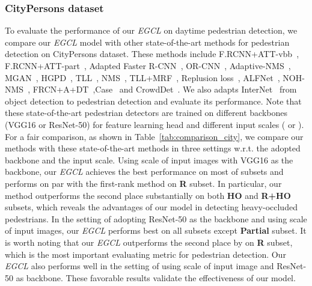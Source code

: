 \documentclass[journal]{IEEEtran}
\newcommand{\MR}[1]{\textcolor[rgb]{0,0,0} {#1}}
\begin{document}
\subsubsection{CityPersons dataset}
To evaluate the performance of our \emph{EGCL} on daytime pedestrian detection, we compare our \emph{EGCL} model with other state-of-the-art methods for pedestrian detection on CityPersons dataset. These methods include F.RCNN+ATT-vbb~\cite{zhang2018occluded}, F.RCNN+ATT-part~\cite{zhang2018occluded}, Adapted Faster R-CNN~\cite{zhang2017citypersons}, OR-CNN~\cite{zhang2018occlusion}, Adaptive-NMS~\cite{liu2019adaptive}, MGAN~\cite{pang2019mask}, HGPD~\cite{li2020learning}, TLL~\cite{song2018small}, NMS~\cite{huang2020nms}, TLL+MRF~\cite{song2018small}, Replusion loss~\cite{wang2018repulsion}, ALFNet~\cite{liu2018learning}, NOH-NMS~\cite{zhou2020noh}, \MR{FRCN+A+DT~\cite{zhou2019discriminative}},Case~\cite{xie2020count} and CrowdDet~\cite{chu2020detection}. We also adapts InterNet~\cite{li2019feature} from object detection to pedestrian detection and evaluate its performance.
Note that these state-of-the-art pedestrian detectors are trained on different backbones (VGG16 or ResNet-50) for feature learning head and different input scales ( or ). For a fair comparison, as shown in Table~\ref{tab:comparison_city}, we compare our methods with these state-of-the-art methods in three settings w.r.t. the adopted backbone and the input scale. Using  scale of input images with VGG16 as the backbone, our \emph{EGCL} achieves the best performance on most of subsets and performs on par with the first-rank method on \textbf{R} subset. In particular, our method outperforms the second place substantially on both \textbf{HO} and \textbf{R+HO} subsets, which reveals the advantages of our model in detecting heavy-occluded pedestrians. In the setting of adopting ResNet-50 as the backbone and using  scale of input images, our \emph{EGCL} performs best on all subsets except \textbf{Partial} subset. It is worth noting that our \emph{EGCL} outperforms the second place by  on  \textbf{R} subset, which is the most important evaluating metric for pedestrian detection. Our \emph{EGCL} also performs well in the setting of using  scale of input image and ResNet-50 as backbone. These favorable results validate the effectiveness of our model.
\end{document}
